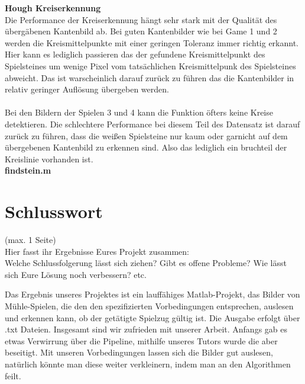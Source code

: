 \documentclass[paper=A4, deutsch]{scrartcl}
\begin{document}
\textbf{Hough Kreiserkennung}\\
Die Performance der Kreiserkennung hängt sehr stark mit der Qualität des übergäbenen Kantenbild ab. Bei guten Kantenbilder wie bei Game 1 und 2 werden die Kreismittelpunkte mit einer geringen Toleranz immer richtig erkannt. Hier kann es lediglich passieren das der gefundene Kreismittelpunkt des Spielsteines um wenige Pixel vom tatsächlichen Kreismittelpunk des Spielsteines abweicht. Das ist warscheinlich darauf zurück zu führen das die Kantenbilder in relativ geringer Auflösung übergeben werden.\\
\\
Bei den Bildern der Spielen 3 und 4 kann die Funktion öfters keine Kreise detektieren. Die schlechtere Performance bei diesem Teil des Datensatz ist darauf zurück zu führen, dass die weißen Spielsteine nur kaum oder garnicht auf dem übergebenen Kantenbild zu erkennen sind. Also das lediglich ein bruchteil der Kreislinie vorhanden ist. \\
  
\textbf{findstein.m} \\



\section{Schlusswort}
(max. 1 Seite)\\
Hier fasst ihr Ergebnisse Eures Projekt zusammen:\\
Welche Schlussfolgerung lässt sich ziehen? Gibt es offene Probleme? Wie lässt sich Eure Lösung noch verbessern? etc.

Das Ergebnis unseres Projektes ist ein lauffähiges Matlab-Projekt, das Bilder von Mühle-Spielen, die den den spezifizierten Vorbedingungen entsprechen, auslesen und erkennen kann, ob der getätigte Spielzug gültig ist. Die Ausgabe erfolgt über .txt Dateien. 
Insgesamt sind wir zufrieden mit unserer Arbeit. Anfangs gab es etwas Verwirrung über die Pipeline, mithilfe unseres Tutors wurde die aber beseitigt.
Mit unseren Vorbedingungen lassen sich die Bilder gut auslesen, natürlich könnte man diese weiter verkleinern, indem man an den Algorithmen feilt.





\end{document}
